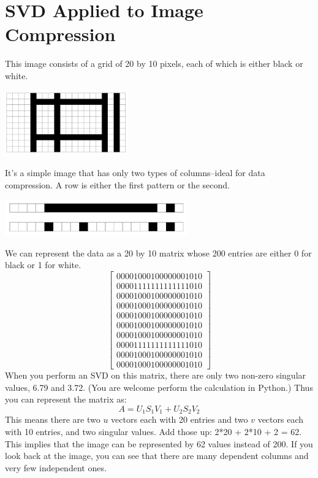 \section{SVD Applied to Image Compression}
This image consists of a grid of 20 by 10 pixels, each of which is either black or white.

\includegraphics[width=0.4\textwidth]{ImageCompress.png}

It's a simple image that has only two types of columns--ideal for data compression. A row is either the first pattern or the second.

\includegraphics[scale=0.8]{Rows.png}

We can represent the data as a 20 by 10 matrix whose 200 entries are either 0 for black or 1 for white. 
$$
\begin{bmatrix}
0 0 0 0 1 0 0 0 1 0 0 0 0 0 0 0 1 0 1 0\\
0 0 0 0 1 1 1 1 1 1 1 1 1 1 1 1 1 0 1 0\\
0 0 0 0 1 0 0 0 1 0 0 0 0 0 0 0 1 0 1 0\\
0 0 0 0 1 0 0 0 1 0 0 0 0 0 0 0 1 0 1 0\\
0 0 0 0 1 0 0 0 1 0 0 0 0 0 0 0 1 0 1 0\\
0 0 0 0 1 0 0 0 1 0 0 0 0 0 0 0 1 0 1 0\\
0 0 0 0 1 0 0 0 1 0 0 0 0 0 0 0 1 0 1 0\\
0 0 0 0 1 1 1 1 1 1 1 1 1 1 1 1 1 0 1 0\\
0 0 0 0 1 0 0 0 1 0 0 0 0 0 0 0 1 0 1 0\\
0 0 0 0 1 0 0 0 1 0 0 0 0 0 0 0 1 0 1 0
\end{bmatrix}
$$
When you perform an SVD on this matrix, there are only two non-zero singular values, 6.79 and 3.72. (You are welcome perform the calculation in Python.) Thus you can represent the matrix as:
$$
A = U_1 S_1 V_1 + U_2 S_2 V_2
$$
This means there are two $u$ vectors each with 20 entries and two $v$ vectors each with 10 entries, and two singular values. Add those up: 2*20 + 2*10 + 2 = 62. This implies that the image can be represented by 62 values instead of 200. If you look back at the image, you can see that there are many dependent columns and very few independent ones. 

